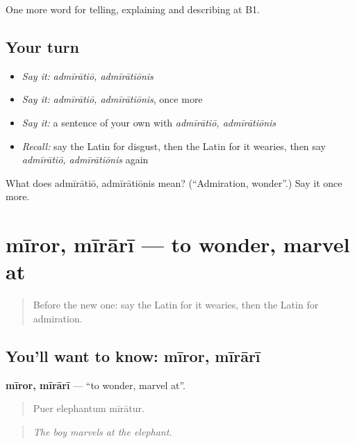 \begin{grammarlens}[title={What you've built}]
One more word for telling, explaining and describing at B1.
\end{grammarlens}

\subsection*{Your turn}
\begin{itemize}
\raggedright
  \item \emph{Say it:} \emph{admīrātiō, admīrātiōnis}
  \item \emph{Say it:} \emph{admīrātiō, admīrātiōnis}, once more
  \item \emph{Say it:} a sentence of your own with \emph{admīrātiō, admīrātiōnis}
  \item \emph{Recall:} say the Latin for disgust, then the Latin for it wearies, then say \emph{admīrātiō, admīrātiōnis} again
\end{itemize}

\begin{tcolorbox}[breakable,colback=teal!4,colframe=teal!35!black,title={Before you move on}]
What does admīrātiō, admīrātiōnis mean? (\textquotedblleft{}Admiration, wonder\textquotedblright{}.) Say it once more.
\end{tcolorbox}
\section[mīror, mīrārī]{mīror, mīrārī — to wonder, marvel at}

\label{lesson:LA-C495-miror}



\begin{quote}
Before the new one: say the Latin for it wearies, then the Latin for admiration.
\end{quote}

\subsection*{You'll want to know: mīror, mīrārī}
\textbf{mīror, mīrārī} — \textquotedblleft{}to wonder, marvel at\textquotedblright{}.

\begin{quote}
Puer elephantum mīrātur.
\end{quote}

\begin{quote}
\emph{The boy marvels at the elephant.}
\end{quote}

